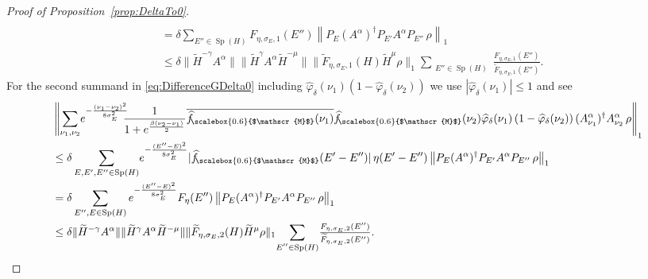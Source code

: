\documentclass[11pt]{amsart}
\newcommand{\1}{\mathbbm{1}}
\newcommand{\spec}{\operatorname{Sp}}
\renewcommand{\phi}{\varphi}
\newcommand{\hatfM}{\widehat{f}_{\!\scalebox{0.6}{$\mathscr{M}$}}
}
\theoremstyle{plain}
\theoremstyle{definition}
\theoremstyle{remark}
\numberwithin{equation}{section}
\begin{document}
\begin{proof}[Proof of Proposition~\ref{prop:DeltaTo0}]
\begin{align*}
    \\&= \delta\sum_{E''\in\spec(H)} F_{\eta,\sigma_E,1}(E'') \left\|P_E(A^\alpha)^\dagger P_{E'}A^\alpha P_{E''}\,\rho\right\|_1  \\&\le \delta\|\widetilde H^{-\gamma}A^{\alpha} \|\|\widetilde H^{\gamma}A^\alpha \widetilde H^{-\mu}\| \|\widetilde F_{\eta,\sigma_E,1}(H)\widetilde{H}^{\mu}\rho\|_1\!\sum_{\substack{E''\in\spec(H)}}\!\tfrac{F_{\eta,\sigma_E,1}(E'')}{\widetilde F_{\eta,\sigma_E,1}(E'')}.
\end{align*}
For the second summand in \eqref{eq:DifferenceGDelta0} including $\widehat\phi_\delta(\nu_1)(1-\widehat\phi_\delta(\nu_2))$ we use $|\widehat\phi_\delta(\nu_1)|\le 1$ and see 
\begin{align*}
&\left\|\sum_{\nu_1,\nu_2}\!e^{-\frac{(\nu_1-\nu_2)^2}{8\sigma_E^2}}\!\!\! \frac{1}{1+e^{\frac{\beta(\nu_2-\nu_1)}{2}}}\overline{\hatfM(\nu_1)}\hatfM(\nu_2)\widehat \phi_\delta(\nu_1)\left(1-\widehat\phi_\delta(\nu_2)\right)(A^\alpha_{\nu_1})^\dagger A^\alpha_{\nu_2}\,\rho\right\|_1\\&\le \delta\sum_{E,E',E''\in\spec(H)}\!e^{-\frac{(E''-E)^2}{8\sigma_E^2}}|\hatfM(E'-E'')|\,\eta(E'-E'')\left\|P_E(A^\alpha)^\dagger P_{E'}A^\alpha P_{E''}\,\rho\right\|_1 
    \\&= \delta\sum_{E'',E\in\spec(H)} e^{-\frac{(E''-E)^2}{8\sigma^2_E}}F_{\eta}(E'') \left\|P_E(A^\alpha)^\dagger P_{E'}A^\alpha P_{E''}\,\rho\right\|_1  \\&\le \delta \|\widetilde H^{-\gamma}A^{\alpha} \|\|\widetilde H^{\gamma}A^\alpha \widetilde H^{-\mu}\| \|\widetilde F_{\eta,\sigma_E,2}(H)\widetilde{H}^{\mu}\rho\|_1\!\sum_{\substack{E''\in\spec(H)}}\!\tfrac{F_{\eta,\sigma_E,2}(E'')}{\widetilde F_{\eta,\sigma_E,2}(E'')}.
\end{align*}
\end{proof}
\end{document}
